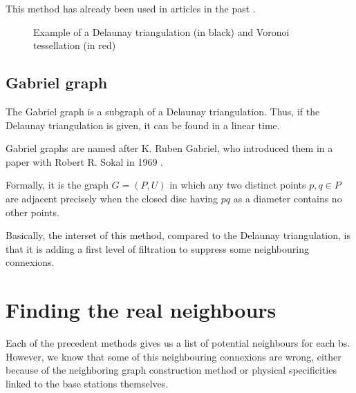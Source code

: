 \documentclass[lettersize,journal,english]{IEEEtran}
\begin{document}
This method has already been used in articles in the past \cite{delaunay_neighbor}.


\begin{figure}[!t]
    \centering
    \caption{Example of a Delaunay triangulation (in black) and Voronoi tessellation (in red)}
    \label{fig:del_tri}
\end{figure}

\subsection{Gabriel graph}
\noindent The Gabriel graph is a subgraph of a Delaunay triangulation. Thus, if the Delaunay triangulation is given, it can be found in a linear time. 

Gabriel graphs are named after K. Ruben Gabriel, who introduced them in a paper with Robert R. Sokal in 1969 \cite{10.2307/2412323}.

Formally, it is the graph $G = (P, U)$ in which any two distinct points $p, q \in P$ are adjacent precisely when the closed disc having $pq$ as a diameter contains no other points.

Basically, the interset of this method, compared to the Delaunay triangulation, is that it is adding a first level of filtration to suppress some neighbouring connexions.

\section{Finding the real neighbours}
\noindent Each of the precedent methods gives us a list of potential neighbours for each \acrshort{bs}. However, we know that some of this neighbouring connexions are wrong,
either because of the neighboring graph construction method or physical specificities linked to the base stations themselves.
\end{document}
